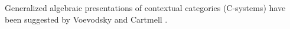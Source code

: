\documentclass{mscs}
\newcommand{\s}{\mathrm{s}}
\newcommand{\Ta}{\mathrm{T}}
\newcommand{\Level}{\mathrm{Level}}
\def\Ctx{\mathrm{Ctx}}
\newcommand{\ctx}{\mathrm{ctx}}
\begin{document}
\begin{remark}
Generalized algebraic presentations of contextual categories (C-systems) have been suggested by Voevodsky \cite{voevodsky:c-systems} and Cartmell \cite{cartmell:gat-contextual}.
\end{remark}



%
%
%
\end{document}
